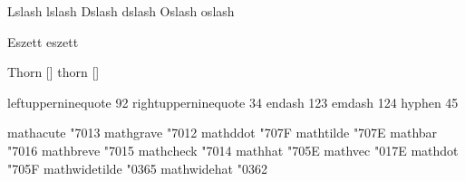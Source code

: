 Lslash  {\Lstroke}
 lslash  {\lstroke}
 Dslash  {\Dstroke}
 dslash  {\dstroke}
 Oslash  {\Ostroke}
 oslash  {\ostroke}

 Eszett  {\Ssharp}
 eszett  {\ssharp}

 Thorn {[]}
 thorn {[]}

\stopencoding


\startencoding[default]

 leftupperninequote   92 
 rightupperninequote  34 
 endash              123
 emdash              124
 hyphen               45 

\stopencoding


\startencoding[default]

 mathacute      "7013 
 mathgrave      "7012 
 mathddot       "707F 
 mathtilde      "707E 
 mathbar        "7016 
 mathbreve      "7015 
 mathcheck      "7014 
 mathhat        "705E 
 mathvec        "017E 
 mathdot        "705F 
 mathwidetilde  "0365 
 mathwidehat    "0362 

\stopencoding

\endinput
